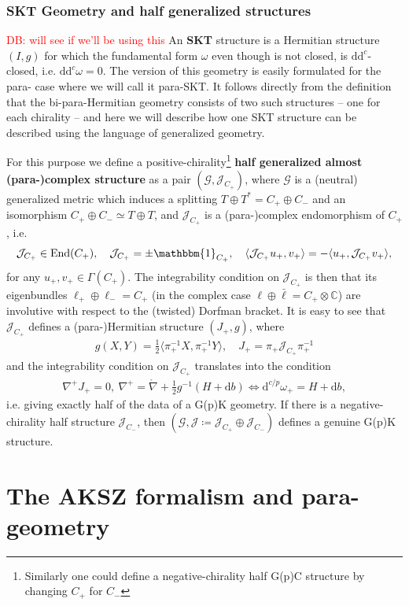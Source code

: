 \documentclass{article}
\newcommand{\TT}{{T\oplus T^*}}
\newcommand{\JJ}{\mathcal{J}}
\newcommand{\GG}{\mathcal{G}}
\newcommand{\id}{\mathbbm{1}}
\newcommand{\lc}{\mathring{\n}}
\newcommand{\n}{\nabla}
\newcommand{\rd}{\mathrm{d}}
\newcommand{\se}{\Gamma}
\newcommand{\la}{\langle}
\newcommand{\ra}{\rangle}
\theoremstyle{definition}
\theoremstyle{remark}
\DeclareMathOperator{\End}{End}
\def\david{\textcolor{red}{DB: }\textcolor{red}}
\begin{document}
\subsubsection{SKT Geometry and half generalized structures}
\david{will see if we'll be using this}
An {\bf SKT} structure is a Hermitian structure $(I,g)$ for which the fundamental form $\omega$ even though is not closed, is $\rd \rd^c$-closed, i.e. $\rd \rd^c \omega=0$. The version of this geometry is easily formulated for the para- case where we will call it para-SKT. It follows directly from the definition that the bi-para-Hermitian geometry consists of two such structures -- one for each chirality -- and here we will describe how one SKT structure can be described using the language of generalized geometry.

For this purpose we define a positive-chirality\footnote{Similarly one could define a negative-chirality half G(p)C structure by changing $C_+$ for $C_-$} {\bf half generalized almost (para-)complex structure} as a pair $(\GG,\JJ_{C_+})$, where $\GG$ is a (neutral) generalized metric which induces a splitting $\TT=C_+\oplus C_-$ and an isomorphism $C_+\oplus C_-\simeq T\oplus T$, and $\JJ_{C_+}$ is a (para-)complex endomorphism of $C_+$, i.e.
\begin{align*}
\JJ_{C_+}\in \End(C_+),\quad \JJ_{C_+}=\pm \id_{C_+},\quad \la \JJ_{C_+} u_+,v_+\ra=-\la u_+,\JJ_{C_+} v_+\ra,
\end{align*}
for any $u_+,v_+ \in \se(C_+)$. The integrability condition on $\JJ_{C_+}$ is then that its eigenbundles $\ell_+\oplus \ell_-=C_+$ (in the complex case $\ell\oplus \bar{\ell}=C_+\otimes \mathbb{C}$) are involutive with respect to the (twisted) Dorfman bracket. It is easy to see that $\JJ_{C_+}$ defines a (para-)Hermitian structure $(J_+,g)$, where
\begin{align*}
g(X,Y)=\frac{1}{2}\la \pi_+^{-1}X,\pi_+^{-1}Y\ra,\quad J_+=\pi_+\JJ_{C_+}\pi^{-1}_+
\end{align*}
and the integrability condition on $\JJ_{C_+}$ translates into the condition
\begin{align*}
\n^+J_+=0,\ \n^+=\lc+\frac{1}{2}g^{-1}(H+\rd b) \Longleftrightarrow \rd^{c/p}\omega_+=H+\rd b,
\end{align*}
i.e. giving exactly half of the data of a G(p)K geometry. If there is a negative-chirality half structure $\JJ_{C_-}$, then $(\GG,\JJ\coloneqq \JJ_{C_+}\oplus \JJ_{C_-})$ defines a genuine G(p)K structure.

\section{The AKSZ formalism and para-geometry} \label{sec: AKSZ}
\end{document}
